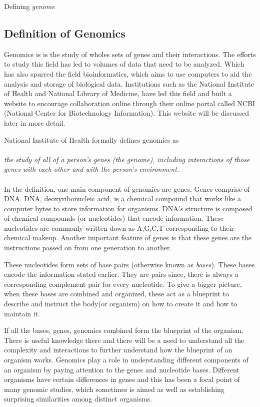 \documentclass[acmsmall]{acmart}
\begin{document}
Defining \textit{genome}

\subsection{Definition of Genomics}
Genomics is is the study of wholes sets of genes and their interactions\cite{campbell}. The efforts to study this field has led to volumes of data that need to be analyzed. Which has also spurred the field bioinformatics, which aims to use computers to aid the analysis and storage of biological data. Institutions such as the National Institute of Health and National Library of Medicine, have led this field and built a website to encourage collaboration online through their online portal called NCBI (National Center for Biotechnology Information). \cite{campbell} This website will be discussed later in more detail.

National Institute of Health \cite{genomics-definition} formally defines genomics as \\ \\
\textit{the study of all of a person's genes (the genome), including interactions of those genes with each other and with the person's environment.} \\ \\

In the definition, one main component of genomics are genes. Genes comprise of DNA. DNA, deoxyribonucleic acid, is a chemical compound that works like a computer bytes to store information for organisms. DNA's structure is composed of chemical compounds (or nucleotides) that encode information. These nucleotides are commonly written down as A,G,C,T corresponding to their chemical makeup. Another important feature of genes is that these genes are the instructions passed on from one generation to another. \cite[p.~2]{hartl2018}

These nucleotides form sets of base pairs (otherwise known as \textit{bases}). These bases encode the information stated earlier. They are pairs since, there is always a corresponding complement pair for every nucleotide. To give a bigger picture, when these bases are combined and organized, these act as a blueprint to describe and instruct the body(or organism) on how to create it and how to maintain it.\cite{alberts_mole}

If all the bases, genes, genomics combined form the blueprint of the organism. There is useful knowledge there and there will be a need to understand all the complexity and interactions to further understand how the blueprint of an organism works. Genomics play a role in understanding different components of an organism by paying attention to the genes and nucleotide bases. Different organisms have certain differences in genes and this has been a focal point of many genomic studies, which sometimes is aimed as well as establishing surprising similarities among distinct organisms.
\end{document}
